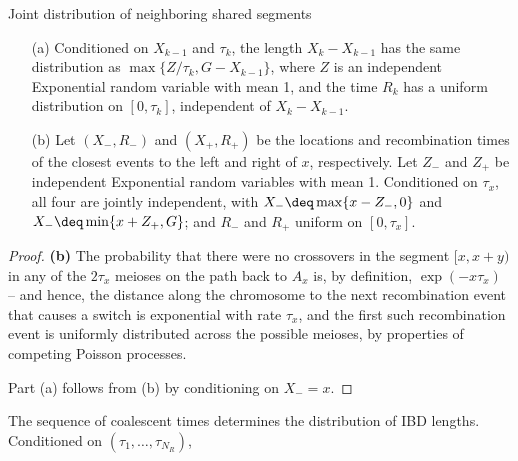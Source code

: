 \begin{lemma}{Joint distribution of neighboring shared segments}
  \begin{enumerate}
      
    \item[(a)] Conditioned on $X_{k-1}$ and $\tau_{k}$, the length $X_k-X_{k-1}$ has the same distribution as $\max\{Z/\tau_k,G-X_{k-1}\}$,
      where $Z$ is an independent Exponential random variable with mean 1,
      and the time $R_k$ has a uniform distribution on $[0,\tau_k]$, independent of $X_k-X_{k-1}$.

    \item[(b)] Let $(X_-,R_-)$ and $(X_+,R_+)$ be the locations and recombination times of the closest events
      to the left and right of $x$, respectively.
      Let $Z_-$ and $Z_+$ be independent Exponential random variables with mean 1.
      Conditioned on $\tau_x$, all four are jointly independent,
      with $X_- \deq \max\{ x-Z_-, 0 \}$ and $X_- \deq \min\{ x+Z_+, G \}$;
      and $R_-$ and $R_+$ uniform on $[0,\tau_x]$.

  \end{enumerate}
\end{lemma}

\begin{proof}

  \textbf{(b)} The probability that there were no crossovers in the segment $[x,x+y)$ in any of the $2\tau_x$ meioses on the path back to $A_x$
  is, by definition, $\exp(-x \tau_x)$ -- and hence, the distance along the chromosome to the next recombination event that causes a switch is exponential with rate $\tau_x$,
  and the first such recombination event is uniformly distributed across the possible meioses,
  by properties of competing Poisson processes.

  Part (a) follows from (b) by conditioning on $X_- = x$.

\end{proof}

\begin{lemma}{The sequence of coalescent times determines the distribution of IBD lengths.}
  Conditioned on $(\tau_1, \ldots, \tau_{N_R})$, 
\end{lemma}


